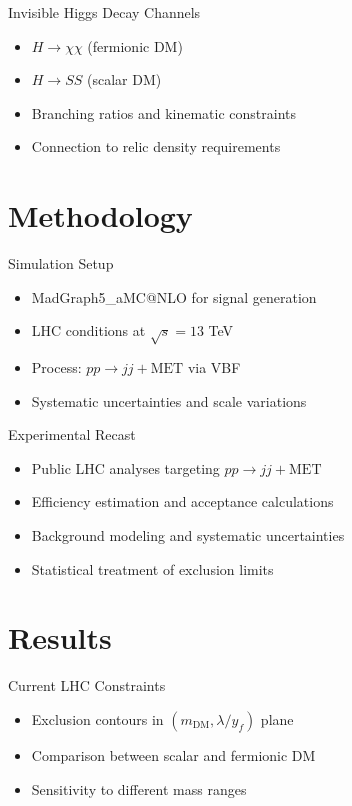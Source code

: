 \documentclass{../../bredelebeamer}
\begin{document}
\begin{frame}{Invisible Higgs Decay Channels}
    \begin{itemize}
        \item $H \to \chi \chi$ (fermionic DM)
        \item $H \to SS$ (scalar DM)
        \item Branching ratios and kinematic constraints
        \item Connection to relic density requirements
    \end{itemize}
\end{frame}

\section{Methodology}
\begin{frame}{Simulation Setup}
    \begin{itemize}
        \item MadGraph5\_aMC@NLO for signal generation
        \item LHC conditions at $\sqrt{s} = 13$ TeV
        \item Process: $pp \to jj + \text{MET}$ via VBF
        \item Systematic uncertainties and scale variations
    \end{itemize}
\end{frame}

\begin{frame}{Experimental Recast}
    \begin{itemize}
        \item Public LHC analyses targeting $pp \to jj + \text{MET}$
        \item Efficiency estimation and acceptance calculations
        \item Background modeling and systematic uncertainties
        \item Statistical treatment of exclusion limits
    \end{itemize}
\end{frame}

\section{Results}
\begin{frame}{Current LHC Constraints}
    \begin{itemize}
        \item Exclusion contours in $(m_{\text{DM}}, \lambda/y_f)$ plane
        \item Comparison between scalar and fermionic DM
        \item Sensitivity to different mass ranges
    \end{itemize}
\end{frame}
\end{document}
